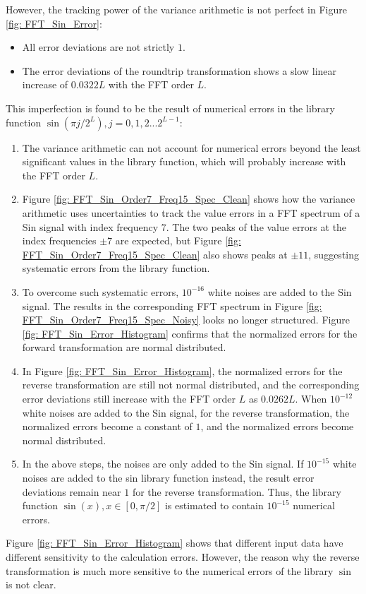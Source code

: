 \documentclass[twoside]{article}
\numberwithin{equation}{section}
\begin{document}
However, the tracking power of the variance arithmetic is not perfect in Figure \ref{fig: FFT_Sin_Error}:
\begin{itemize}
\item All error deviations are not strictly $1$.

\item The error deviations of the roundtrip transformation shows a slow linear increase of $0.0322 L$ with the FFT order $L$.
\end{itemize}  
This imperfection is found to be the result of numerical errors in the library function $\sin(\pi j /2^L), j = 0, 1, 2 ... 2^{L-1}$:
\begin{enumerate}
\item The variance arithmetic can not account for numerical errors beyond the least significant values in the library function, which will probably increase with the FFT order $L$.

\item Figure \ref{fig: FFT_Sin_Order7_Freq15_Spec_Clean} shows how the variance arithmetic uses uncertainties to track the value errors in a FFT spectrum of a Sin signal with index frequency $7$.
The two peaks of the value errors at the index frequencies $\pm 7$ are expected, but Figure \ref{fig: FFT_Sin_Order7_Freq15_Spec_Clean} also shows peaks at $\pm 11$, suggesting systematic errors from the library function.

\item To overcome such systematic errors, $10^{-16}$ white noises are added to the Sin signal.
The results in the corresponding FFT spectrum in Figure \ref{fig: FFT_Sin_Order7_Freq15_Spec_Noisy} looks no longer structured. 
Figure \ref{fig: FFT_Sin_Error_Histogram} confirms that the normalized errors for the forward transformation are normal distributed.

\item In Figure \ref{fig: FFT_Sin_Error_Histogram}, the normalized errors for the reverse transformation are still not normal distributed, and the corresponding error deviations still increase with the FFT order $L$ as $0.0262 L$.
When $10^{-12}$ white noises are added to the Sin signal, for the reverse transformation, the normalized errors become a constant of $1$, and the normalized errors become normal distributed.

\item In the above steps, the noises are only added to the Sin signal.
If $10^{-15}$ white noises are added to the sin library function instead, the result error deviations remain near $1$ for the reverse transformation.
Thus, the library function $\sin(x), x \in [0, \pi/2]$ is estimated to contain $10^{-15}$ numerical errors.
\end{enumerate}
Figure \ref{fig: FFT_Sin_Error_Histogram} shows that different input data have different sensitivity to the calculation errors.
However, the reason why the reverse transformation is much more sensitive to the numerical errors of the library $\sin$ is not clear.
\end{document}
